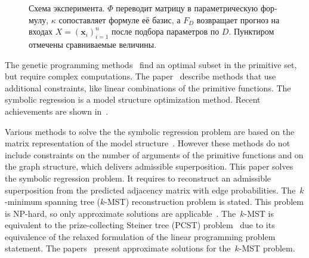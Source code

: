 \documentclass[12pt]{article}
\newif\ifhighlight \highlighttrue
\newenvironment{ru}{\begin{otherlanguage}{russian}\ifhighlight\color{blue}\fi}{\end{otherlanguage}}
\newcommand{\vx}{\mathbf{x}}
\newcommand{\tht}{\bm{\theta}}
\begin{document}
\begin{ru}
\begin{figure}[!ht]
\centering
\ifhighlight\color{blue}\fi
{}
\caption{Схема эксперимента. $\Phi$ переводит матрицу в параметрическую формулу, $\kappa$ сопоставляет формуле её базис, а $F_D$ возвращает прогноз на входах $X=(\vx_i)_{i=1}^n$ после подбора параметров по $D$. Пунктиром отмечены сравниваемые величины.}
\label{fig:intro-recovery}
\end{figure}
\end{ru}

The genetic programming methods~\cite{koza1992genetic} %
find an optimal subset in the primitive set, but require complex computations. The paper~\cite{searson2010gptips} %
describe methods that use additional constraints, like linear combinations of the primitive functions. The symbolic regression is a model structure optimization method. Recent achievements are shown in~\cite{stanley2002evolving}.%

Various methods to solve the the symbolic regression problem are based on the matrix representation of the model structure~\cite{bochkarev2017generation}. However these methods do not include constraints on the number of arguments of the primitive functions and on the graph structure, which delivers admissible superposition.
This paper solves the symbolic regression problem. It requires to reconstruct an admissible superposition from the predicted adjacency matrix with edge probabilities. The~$k$-minimum spanning tree ($k$-MST) reconstruction problem is stated. This problem is NP-hard,
so only approximate solutions are applicable~\cite{ravi1996spanning}. The~$k$-MST is equivalent to the prize-collecting Steiner tree (PCST) problem~\cite{chudak2004approximate} due to its equivalence of the relaxed formulation of the linear programming problem statement.
%
The papers~\cite{ravi1996spanning,awerbuch1998new,arora20062+} present approximate solutions for the~$k$-MST problem.
\end{document}
